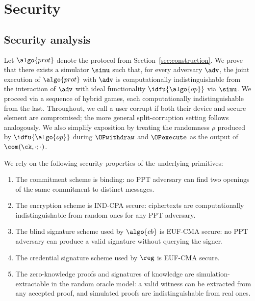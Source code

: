 \section{Security}\label{sec:offline-security}

\subsection{Security analysis}

Let $\algo{prot}$ denote the protocol from Section~\ref{sec:construction}. We
prove that there exists a simulator $\simu$ such that, for every adversary
$\adv$, the joint execution of $\algo{prot}$ with $\adv$ is computationally
indistinguishable from the interaction of $\adv$ with ideal functionality
$\idfu{\algo{op}}$ via $\simu$. We proceed via a sequence of hybrid games, each
computationally indistinguishable from the last. Throughout, we call a user
corrupt if both their device and secure element are compromised; the more
general split-corruption setting follows analogously. We also simplify
exposition by treating the randomness $\rho$ produced by $\idfu{\algo{op}}$ during
$\OPwithdraw$ and $\OPexecute$ as the output of $\com(\ck, \cdot; \cdot)$.

We rely on the following security properties of the underlying primitives:

\begin{enumerate}

  \item[(P1)] The commitment scheme is binding: no PPT adversary can find two
    openings of the same commitment to distinct messages.

  \item[(P2)] The encryption scheme is IND-CPA secure: ciphertexts are
    computationally indistinguishable from random ones for any PPT adversary.

  \item[(P3)] The blind signature scheme used by $\algo{cb}$ is EUF-CMA secure:
    no PPT adversary can produce a valid signature without querying the signer.

  \item[(P4)] The credential signature scheme used by $\reg$ is EUF-CMA secure.

  \item[(P5)] The zero-knowledge proofs and signatures of knowledge are
    simulation-extractable in the random oracle model: a valid witness can be
    extracted from any accepted proof, and simulated proofs are
    indistinguishable from real ones.

\end{enumerate}

